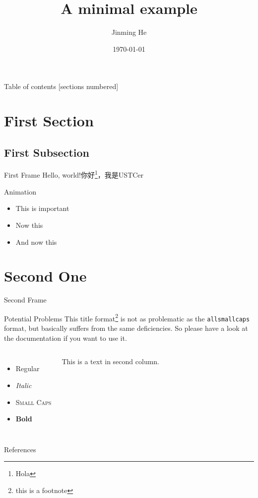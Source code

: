 \documentclass[utf8,10pt]{beamer}
\title{A minimal example}
\date{\today}
\author{Jinming He}
\institute{Physics Department, USTC}
\begin{document}
  \maketitle

  \begin{frame}{Table of contents}
    [sections numbered]
    \tableofcontents%
  \end{frame}

  \section[Intro]{First Section}

  \subsection{First Subsection}
  \begin{frame}{First Frame}
    Hello, world!你好\footnote{Hola}，我是USTCer\cite{gqm}\cite{qm2}
  \end{frame}

  \begin{frame}{Animation}
  \begin{itemize}[<+- | alert@+>]
    \item \alert<4>{This is important}
    \item Now this
    \item And now this
  \end{itemize}
  \end{frame}

  \section[second section]{Second One}


  \begin{frame}{Second Frame}
    \begin{block}{Potential Problems}
		  This title format\footnote{this is a footnote} is not as problematic as the \texttt{allsmallcaps} format, but basically suffers from the same deficiencies. \alert{So please have a look at the documentation if you want to use it.}
	  \end{block}

    \begin{columns}[T,onlytextwidth]
	  \begin{itemize}
      \item Regular
      \item \textit{Italic}
      \item \textsc{Small Caps}
      \item \textbf{Bold}
    \end{itemize}

    This is a text in second column.

    \end{columns}
  \end{frame}

\begin{frame}{References}
  
\end{frame}
\end{document}
